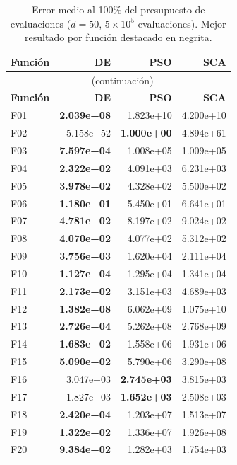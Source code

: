 \documentclass[12pt,a4paper]{article}
\begin{document}
\begin{longtable}{lrrr}
\caption{Error medio al 100\% del presupuesto de evaluaciones ($d=50$, $5\times10^5$ evaluaciones). Mejor resultado por función destacado en negrita.}
\label{tab:resultados_final_d50}\\
\toprule
\textbf{Función} & \textbf{DE} & \textbf{PSO} & \textbf{SCA} \\
\midrule
\endfirsthead
\multicolumn{4}{c}{\tablename~\thetable{} (continuación)}\\
\toprule
\textbf{Función} & \textbf{DE} & \textbf{PSO} & \textbf{SCA} \\
\midrule
\endhead
\midrule
\endfoot
\bottomrule
\endlastfoot
F01  & \textbf{2.039e+08} & 1.823e+10 & 4.200e+10 \\
F02  & 5.158e+52 & \textbf{1.000e+00} & 4.894e+61 \\
F03  & \textbf{7.597e+04} & 1.008e+05 & 1.009e+05 \\
F04  & \textbf{2.322e+02} & 4.091e+03 & 6.231e+03 \\
F05  & \textbf{3.978e+02} & 4.328e+02 & 5.500e+02 \\
F06  & \textbf{1.180e+01} & 5.450e+01 & 6.641e+01 \\
F07  & \textbf{4.781e+02} & 8.197e+02 & 9.024e+02 \\
F08  & \textbf{4.070e+02} & 4.077e+02 & 5.312e+02 \\
F09  & \textbf{3.756e+03} & 1.620e+04 & 2.111e+04 \\
F10  & \textbf{1.127e+04} & 1.295e+04 & 1.341e+04 \\
F11  & \textbf{2.173e+02} & 3.151e+03 & 4.689e+03 \\
F12  & \textbf{1.382e+08} & 6.062e+09 & 1.075e+10 \\
F13  & \textbf{2.726e+04} & 5.262e+08 & 2.768e+09 \\
F14  & \textbf{1.683e+02} & 1.558e+06 & 1.931e+06 \\
F15  & \textbf{5.090e+02} & 5.790e+06 & 3.290e+08 \\
F16  & 3.047e+03 & \textbf{2.745e+03} & 3.815e+03 \\
F17  & 1.827e+03 & \textbf{1.652e+03} & 2.508e+03 \\
F18  & \textbf{2.420e+04} & 1.203e+07 & 1.513e+07 \\
F19  & \textbf{1.322e+02} & 1.336e+07 & 1.926e+08 \\
F20  & \textbf{9.384e+02} & 1.282e+03 & 1.754e+03 \\

\end{longtable}
\end{document}
